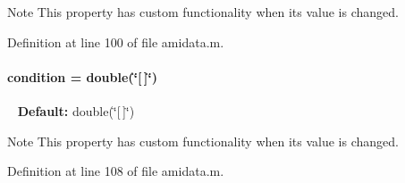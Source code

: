 \begin{DoxyNote}{Note}
This property has custom functionality when its value is changed. 
\end{DoxyNote}


Definition at line 100 of file amidata.\+m.

\hypertarget{classamidata_a4824b91cc0e6b5f112bdd8049af4d7d6}{}
\paragraph[{condition}]{\setlength{\rightskip}{0pt plus 5cm}condition = double(\char`\"{}\mbox{[}$\,$\mbox{]}\char`\"{})}\label{classamidata_a4824b91cc0e6b5f112bdd8049af4d7d6}
~\newline
{\bfseries Default\+:} double(\char`\"{}\mbox{[}$\,$\mbox{]}\char`\"{})

\begin{DoxyNote}{Note}
This property has custom functionality when its value is changed. 
\end{DoxyNote}


Definition at line 108 of file amidata.\+m.


